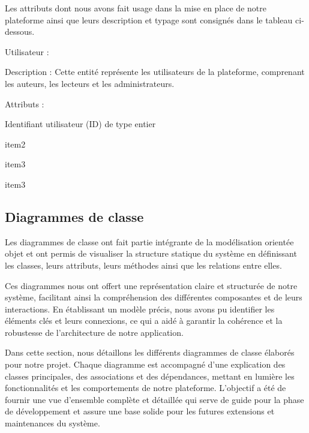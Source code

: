 Les attributs dont nous avons fait usage dans la mise en place de notre plateforme ainsi que leurs description et typage sont consignés dans le tableau ci-dessous.
\par 

 Utilisateur  :
\renewcommand{\labelitemi}{\tiny$\bullet$}
\begin{itemize}[leftmargin=2cm, topsep=0pt]
        \begin{spacing}{1.25}
        \item Description : Cette entité représente les utilisateurs de la plateforme, comprenant les auteurs, les lecteurs et les administrateurs.
        \item Attributs :
        \begin{itemize}[leftmargin=2cm, topsep=0pt]
        \begin{spacing}{1.25}
        \item 	Identifiant utilisateur (ID) de type 			entier
        \item item2
        \item item3
        \end{spacing}
\end{itemize}
        \item item3
        \end{spacing}
\end{itemize}
\begin{spacing}{0.5}
\end{spacing}

\subsection{Diagrammes de classe}
Les diagrammes de classe ont fait partie intégrante de la modélisation orientée objet et ont permis de visualiser la structure statique du système en définissant les classes, leurs attributs, leurs méthodes ainsi que les relations entre elles.\par

Ces diagrammes nous ont offert une représentation claire et structurée de notre système, facilitant ainsi la compréhension des différentes composantes et de leurs interactions. En établissant un modèle précis, nous avons pu identifier les éléments clés et leurs connexions, ce qui a aidé à garantir la cohérence et la robustesse de l'architecture de notre application.\par

Dans cette section, nous détaillons les différents diagrammes de classe élaborés pour notre projet. Chaque diagramme est accompagné d'une explication des classes principales, des associations et des dépendances, mettant en lumière les fonctionnalités et les comportements de notre plateforme. L'objectif a été de fournir une vue d'ensemble complète et détaillée qui serve de guide pour la phase de développement et assure une base solide pour les futures extensions et maintenances du système.\par

